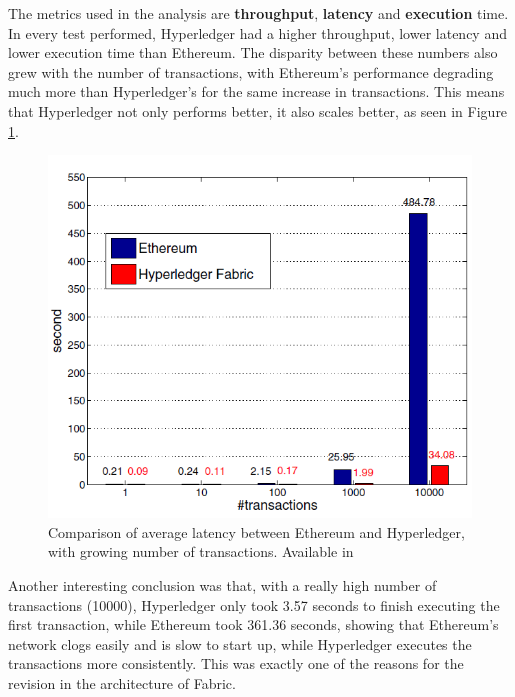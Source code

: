 The metrics used in the analysis are \textbf{throughput}, \textbf{latency} and \textbf{execution} time.
In every test performed, Hyperledger had a higher throughput, lower latency and lower execution time than Ethereum. The disparity between these numbers also grew with the number of transactions, with Ethereum's performance degrading much more than Hyperledger's for the same increase in transactions. This means that Hyperledger not only performs better, it also scales better, as seen in Figure \ref{fig:latency_comparison}.

\begin{figure}[h]
\centering
\includegraphics[scale=0.75]{media/average_latency_frameworks.png}
\caption[Comparison of average latency between Ethereum and Hyperledger, with growing number of transactions]{Comparison of average latency between Ethereum and Hyperledger, with growing number of transactions. Available in \cite{Pongnumkul2017}}
\label{fig:latency_comparison}
\end{figure}

Another interesting conclusion was that, with a really high number of transactions (10000), Hyperledger only took 3.57 seconds to finish executing the first transaction, while Ethereum took 361.36 seconds, showing that Ethereum's network clogs easily and is slow to start up, while Hyperledger executes the transactions more consistently. This was exactly one of the reasons for the revision in the architecture of Fabric.

